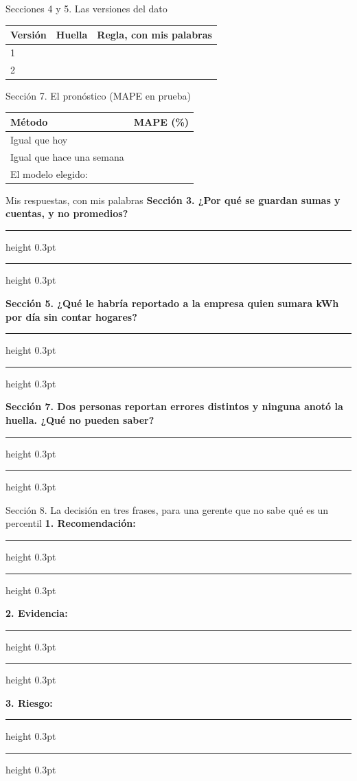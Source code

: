 \documentclass[10pt,letterpaper]{article}
\newcommand{\renglon}{\vspace{6mm}\hrule height 0.3pt\relax}
\begin{document}
\begin{caja}{Secciones 4 y 5. Las versiones del dato}
\begin{tabularx}{\linewidth}{|l|X|X|}\hline
\textbf{\small Versión} & \textbf{\small Huella} & \textbf{\small Regla, con mis palabras}\\\hline
\rule{0pt}{7mm}1 &  & \\\hline
\rule{0pt}{7mm}2 &  & \\\hline
\end{tabularx}
\end{caja}
\begin{caja}{Sección 7. El pronóstico (MAPE en prueba)}
\begin{tabularx}{\linewidth}{|l|X|}\hline
\textbf{\small Método} & \textbf{\small MAPE (\%)}\\\hline
\rule{0pt}{7mm}Igual que hoy & \\\hline
\rule{0pt}{7mm}Igual que hace una semana & \\\hline
\rule{0pt}{7mm}El modelo elegido: & \\\hline
\end{tabularx}
\end{caja}
\begin{caja}{Mis respuestas, con mis palabras}
{\small\bfseries Sección 3. ¿Por qué se guardan sumas y cuentas, y no promedios?}\renglon\renglon\vspace{2mm}

{\small\bfseries Sección 5. ¿Qué le habría reportado a la empresa quien sumara kWh por día sin contar hogares?}\renglon\renglon\vspace{2mm}

{\small\bfseries Sección 7. Dos personas reportan errores distintos y ninguna anotó la huella. ¿Qué no pueden saber?}\renglon\renglon\vspace{2mm}

\end{caja}
\begin{cajaroja}{Sección 8. La decisión en tres frases, para una gerente que no sabe qué es un percentil}
{\small\bfseries 1. Recomendación:}\renglon\renglon\vspace{2mm}

{\small\bfseries 2. Evidencia:}\renglon\renglon\vspace{2mm}

{\small\bfseries 3. Riesgo:}\renglon\renglon\vspace{2mm}

\end{cajaroja}
\end{document}
